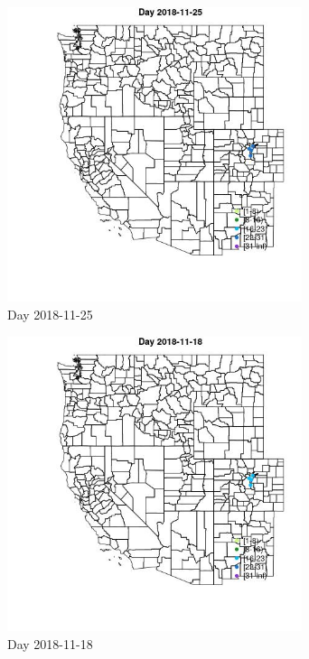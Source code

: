 \begin{figure} 
\centering  
\includegraphics[width=0.77\textwidth]{Code_Outputs/Report_ML_input_PM25_Step4_part_e_de_duplicated_aveswNAs_MapObsDay2018-11-25.jpg} 
\caption{\label{fig:Report_ML_input_PM25_Step4_part_e_de_duplicated_aveswNAsMapObsDay2018-11-25}Day 2018-11-25} 
\end{figure} 
 

\begin{figure} 
\centering  
\includegraphics[width=0.77\textwidth]{Code_Outputs/Report_ML_input_PM25_Step4_part_e_de_duplicated_aveswNAs_MapObsDay2018-11-18.jpg} 
\caption{\label{fig:Report_ML_input_PM25_Step4_part_e_de_duplicated_aveswNAsMapObsDay2018-11-18}Day 2018-11-18} 
\end{figure} 
 

